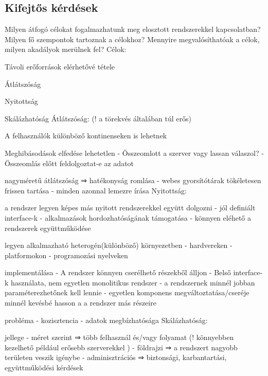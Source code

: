 \documentclass[12pt]{article}
\begin{document}
\subsection{Kifejtős kérdések}
\begin{description}
    \item  Milyen átfogó célokat fogalmazhatunk meg elosztott rendszerekkel kapcsolatban? Milyen fő szempontok tartoznak a célokhoz? Mennyire megvalósíthatóak a célok, milyen akadályok merülnek fel?
        Célok:
    \item Távoli erőforrások elérhetővé tétele
    \item Átlátszóság
    \item Nyitottság
    \item Skálázhatóság
        Átlátszóság: (! a törekvés általában túl erős)
    \item A felhasználók különböző kontinenseken is lehetnek 
    \item Meghibásodások elfedése lehetetlen
        - Összeomlott a szerver vagy lassan válaszol? 
        - Összeomlás előtt feldolgoztat-e az adatot
    \item nagyméretű átlátszóság ⇒ hatékonyság romlása
        - webes gyorsítótárak tökéletesen frissen tartása
        - minden azonnal lemezre írása
        Nyitottság: 
    \item a rendszer legyen képes más nyitott rendszerekkel együtt dolgozni
        - jól definiált interface-k
        - alkalmazások hordozhatóságának támogatása
        - könnyen eléhető a rendszerek együttműködése
    \item legyen alkalmazható heterogén(különböző) környezetben
        - hardvereken
        - platformokon
        - programozási nyelveken
    \item implementálása
        - A rendszer könnyen cserélhető részekből álljon
        - Belső interface-k használata, nem egyetlen monolitikus rendszer
        - a rendszernek minnél jobban paraméterezhetőnek kell lennie
        - egyetlen komponens megváltoztatása/cseréje minnél kevésbé hasson a a rendszer más részeire
    \item probléma
        - kozisztencia
        - adatok megbízhatósága
        Skálázhatóság:
    \item jellege
        - méret szerint   ⇒ több felhasznál és/vagy folyamat  (! könnyebben kezelhető például erősebb szerverekkel )
        - földrajzi       ⇒ a rendszert nagyobb területen veszik igénybe
        - adminisztrációs ⇒ biztonsági, karbantartási, együttműködési kérdések

\end{description}
\end{document}
